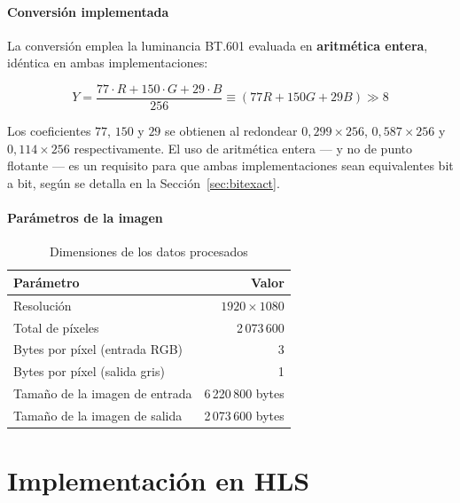\documentclass[11pt,letterpaper]{article}
\begin{document}
\subsection{Conversión implementada}

La conversión emplea la luminancia BT.601 evaluada en \textbf{aritmética
entera}, idéntica en ambas implementaciones:

\begin{equation}
Y = \frac{77 \cdot R + 150 \cdot G + 29 \cdot B}{256}
  \equiv (77R + 150G + 29B) \gg 8
\label{eq:bt601}
\end{equation}

Los coeficientes $77$, $150$ y $29$ se obtienen al redondear
$0{,}299 \times 256$, $0{,}587 \times 256$ y $0{,}114 \times 256$
respectivamente. El uso de aritmética entera
--- y no de punto flotante --- es un requisito para que ambas implementaciones
sean equivalentes bit a bit, según se detalla en la
Sección~\ref{sec:bitexact}.

\subsection{Parámetros de la imagen}

\begin{table}[H]
\centering
\caption{Dimensiones de los datos procesados}
\begin{tabular}{@{}lr@{}}
\toprule
\textbf{Parámetro} & \textbf{Valor} \\
\midrule
Resolución                      & $1920 \times 1080$ \\
Total de píxeles                & 2\,073\,600 \\
Bytes por píxel (entrada RGB)   & 3 \\
Bytes por píxel (salida gris)   & 1 \\
Tamaño de la imagen de entrada  & 6\,220\,800 bytes \\
Tamaño de la imagen de salida   & 2\,073\,600 bytes \\
\bottomrule
\end{tabular}
\end{table}

\newpage
\part{Implementación en HLS}
\label{part:hls}
\end{document}
